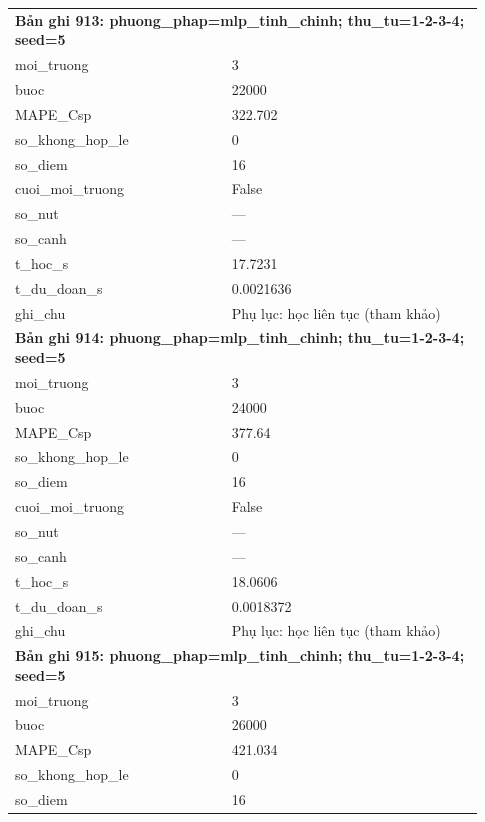 \begin{longtable}{p{0.43\linewidth}p{0.50\linewidth}}
\midrule
\multicolumn{2}{p{0.95\linewidth}}{\textbf{Bản ghi 913: phuong\_phap=mlp\_tinh\_chinh; thu\_tu=1-2-3-4; seed=5}} \\
moi\_\allowbreak truong & 3 \\
buoc & 22000 \\
MAPE\_\allowbreak Csp & 322.702 \\
so\_\allowbreak khong\_\allowbreak hop\_\allowbreak le & 0 \\
so\_\allowbreak diem & 16 \\
cuoi\_\allowbreak moi\_\allowbreak truong & False \\
so\_\allowbreak nut & — \\
so\_\allowbreak canh & — \\
t\_\allowbreak hoc\_\allowbreak s & 17.7231 \\
t\_\allowbreak du\_\allowbreak doan\_\allowbreak s & 0.0021636 \\
ghi\_\allowbreak chu & Phụ lục: học liên tục (tham khảo) \\
\midrule
\multicolumn{2}{p{0.95\linewidth}}{\textbf{Bản ghi 914: phuong\_phap=mlp\_tinh\_chinh; thu\_tu=1-2-3-4; seed=5}} \\
moi\_\allowbreak truong & 3 \\
buoc & 24000 \\
MAPE\_\allowbreak Csp & 377.64 \\
so\_\allowbreak khong\_\allowbreak hop\_\allowbreak le & 0 \\
so\_\allowbreak diem & 16 \\
cuoi\_\allowbreak moi\_\allowbreak truong & False \\
so\_\allowbreak nut & — \\
so\_\allowbreak canh & — \\
t\_\allowbreak hoc\_\allowbreak s & 18.0606 \\
t\_\allowbreak du\_\allowbreak doan\_\allowbreak s & 0.0018372 \\
ghi\_\allowbreak chu & Phụ lục: học liên tục (tham khảo) \\
\midrule
\multicolumn{2}{p{0.95\linewidth}}{\textbf{Bản ghi 915: phuong\_phap=mlp\_tinh\_chinh; thu\_tu=1-2-3-4; seed=5}} \\
moi\_\allowbreak truong & 3 \\
buoc & 26000 \\
MAPE\_\allowbreak Csp & 421.034 \\
so\_\allowbreak khong\_\allowbreak hop\_\allowbreak le & 0 \\
so\_\allowbreak diem & 16 \\

\end{longtable}
